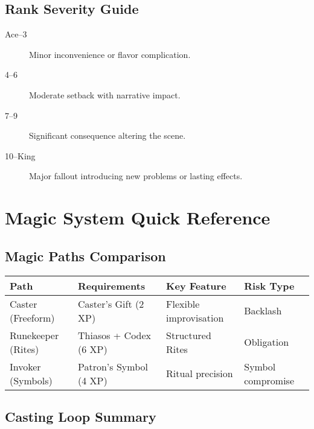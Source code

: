 \subsection{Rank Severity Guide}
\label{subsec:rank-severity}

\begin{description}
\item[Ace--3] Minor inconvenience or flavor complication.
\item[4--6] Moderate setback with narrative impact.
\item[7--9] Significant consequence altering the scene.
\item[10--King] Major fallout introducing new problems or lasting effects.
\end{description}

\section{Magic System Quick Reference}
\label{sec:magic-reference}

\subsection{Magic Paths Comparison}
\label{subsec:magic-paths-ref}

\begin{center}
\feTableStart
\begin{tabularx}{\linewidth}{@{}l l l l @{}}
\toprule
\textbf{Path} & \textbf{Requirements} & \textbf{Key Feature} & \textbf{Risk Type} \\
\midrule
Caster (Freeform) & Caster's Gift (2 XP) & Flexible improvisation & Backlash \\
Runekeeper (Rites) & Thiasos + Codex (6 XP) & Structured Rites & Obligation \\
Invoker (Symbols) & Patron's Symbol (4 XP) & Ritual precision & Symbol compromise \\
\bottomrule
\end{tabularx}
\feTableEnd
\end{center}

\subsection{Casting Loop Summary}
\label{subsec:casting-loop-ref}

